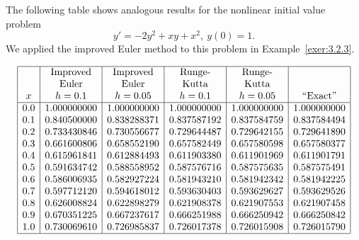 \documentclass{ximera}
\begin{document}
\begin{example}\label{example:3.3.3}
The following table shows analogous results
for the nonlinear initial value problem
$$
y'=-2y^2+xy+x^2,\ y(0)=1.
$$
We applied the improved Euler  method to this problem in
Example~\ref{exer:3.2.3}.


$$
\begin{array}{|c|c|c|c|c|c|}
\hline
 & \text{Improved} & \text{Improved} & \text{Runge-} & \text{Runge-}& \\
 & \text{Euler} &\text{Euler} &\text{Kutta} & \text{Kutta}& \\
x&
h=0.1&
h=0.05&
h=0.1&
h=0.05&
\text{``Exact''}\\ \hline
0.0  &1.000000000 & 1.000000000 &1.000000000 & 1.000000000& 1.000000000 \\
0.1  &0.840500000 & 0.838288371 &0.837587192 & 0.837584759& 0.837584494 \\
0.2  &0.733430846 & 0.730556677 &0.729644487 & 0.729642155& 0.729641890 \\
0.3  &0.661600806 & 0.658552190 &0.657582449 & 0.657580598& 0.657580377 \\
0.4  &0.615961841 & 0.612884493 &0.611903380 & 0.611901969& 0.611901791 \\
0.5  &0.591634742 & 0.588558952 &0.587576716 & 0.587575635& 0.587575491 \\
0.6  &0.586006935 & 0.582927224 &0.581943210 & 0.581942342& 0.581942225 \\
0.7  &0.597712120 & 0.594618012 &0.593630403 & 0.593629627& 0.593629526 \\
0.8  &0.626008824 & 0.622898279 &0.621908378 & 0.621907553& 0.621907458 \\
0.9  &0.670351225 & 0.667237617 &0.666251988 & 0.666250942& 0.666250842 \\
1.0  &0.730069610 & 0.726985837 &0.726017378 & 0.726015908& 0.726015790\\
\hline
\end{array}
$$

\end{example}
\end{document}
